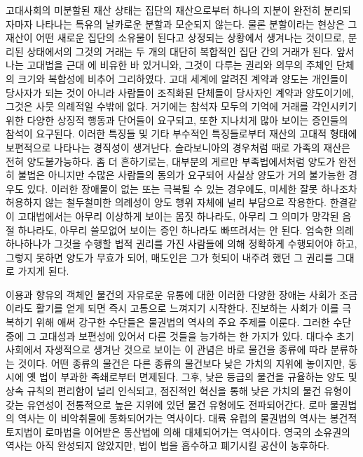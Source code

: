 고대사회의 미분할된 재산 상태는
집단의 재산으로부터 하나의 지분이 완전히 분리되자마자 나타나는
특유의 날카로운 분할과 모순되지 않는다.
물론 분할이라는 현상은
그 재산이 어떤 새로운 집단의 소유물이 된다고 상정되는 상황에서
생겨나는 것이므로,
분리된 상태에서의 그것의 거래는
두 개의 대단히 복합적인 집단 간의 거래가 된다.
앞서 나는 고대법을 근대 에 비유한 바 있거니와,
그것이 다루는 권리와 의무의 주체인 단체의 크기와 복합성에 비추어 그리하였다.
고대 세계에 알려진 계약과 양도는
개인들이 당사자가 되는 것이 아니라
사람들이 조직화된 단체들이 당사자인 계약과 양도이기에,
그것은 사뭇 의례적일 수밖에 없다.
거기에는
참석자 모두의 기억에 거래를 각인시키기 위한
다양한 상징적 행동과 단어들이 요구되고,
또한 지나치게 많아 보이는 증인들의 참석이 요구된다.
이러한 특징들 및 기타 부수적인 특징들로부터
재산의 고대적 형태에 보편적으로 나타나는 경직성이 생겨난다.
슬라보니아의 경우처럼
때로 가족의 재산은 전혀 양도불가능하다.
좀 더 흔하기로는,
대부분의 게르만 부족법에서처럼
양도가 완전히 불법은 아니지만
수많은 사람들의 동의가 요구되어
사실상 양도가 거의 불가능한 경우도 있다.
이러한 장애물이 없는
또는 극복될 수 있는 경우에도,
미세한 잘못 하나조차 허용하지 않는 철두철미한 의례성이
양도 행위 자체에 널리 부담으로 작용한다.
한결같이
고대법에서는
아무리 이상하게 보이는 몸짓 하나라도,
아무리 그 의미가 망각된 음절 하나라도,
아무리 쓸모없어 보이는 증인 하나라도
빠뜨려서는 안 된다.
엄숙한 의례 하나하나가
그것을 수행할 법적 권리를 가진 사람들에 의해
정확하게 수행되어야 하고,
그렇지 못하면
양도가 무효가 되어,
매도인은 그가 헛되이 내주려 했던 그 권리를 그대로 가지게 된다.

이용과 향유의 객체인 물건의 자유로운 유통에 대한 이러한 다양한 장애는
사회가 조금이라도 활기를 얻게 되면 즉시
고통으로 느껴지기 시작한다.
진보하는 사회가 이를 극복하기 위해 애써 강구한 수단들은
물권법의 역사의 주요 주제를 이룬다.
그러한 수단 중에
그 고대성과 보편성에 있어서 다른 것들을 능가하는 한 가지가 있다.
대다수 초기 사회에서 자생적으로 생겨난 것으로 보이는 이 관념은
바로 물건을 종류에 따라 분류하는 것이다.
어떤 종류의 물건은 다른 종류의 물건보다 낮은 가치의 지위에 놓이지만,
동시에 옛 법이 부과한 족쇄로부터 면제된다.
그후,
낮은 등급의 물건을 규율하는 양도 및 상속 규칙의 편리함이
널리 인식되고,
점진적인 혁신을 통해 낮은 가치의 물건 유형이 갖는 유연성이
전통적으로 높은 지위에 있던 물건 유형에도 전파되어간다.
로마 물권법의 역사는 이
비악취물에 동화되어가는
역사이다.
대륙 유럽의 물권법의 역사는
봉건적 토지법이 로마법을 이어받은 동산법에 의해
대체되어가는 역사이다.
영국의 소유권의 역사는 아직 완성되지 않았지만,
법이
법을
흡수하고 폐기시킬 공산이
농후하다.

